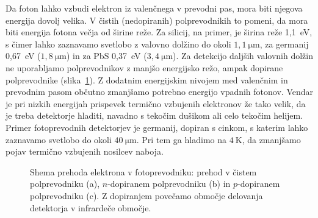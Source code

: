 Da foton lahko vzbudi elektron iz valenčnega v prevodni pas, mora biti njegova energija dovolj velika. 
V čistih (nedopiranih) polprevodnikih to pomeni, da mora biti energija fotona večja od 
širine reže. Za silicij, na primer, je širina reže 1,1~eV, 
s čimer lahko zaznavamo svetlobo z valovno dolžino do okoli 
$1,1~\si{\micro\meter}$, za germanij 0,67~eV ($1,8~\si{\micro\meter}$) in za PbS 0,37~eV
($3,4~\si{\micro\meter}$). 
Za detekcijo daljših valovnih dolžin ne uporabljamo polprevodnikov
z manjšo energijsko režo, ampak dopirane polprevodnike (slika~\ref{fig:FPrevodnik}). 
Z dodatnim energijskim nivojem med valenčnim in prevodnim pasom občutno zmanjšamo 
potrebno energijo vpadnih fotonov. Vendar je pri  nizkih energijah prispevek termično 
vzbujenih elektronov že tako velik, da je treba detektorje hladiti, navadno s tekočim
dušikom ali celo tekočim helijem. Primer fotoprevodnih detektorjev je germanij, dopiran s cinkom, 
s katerim lahko zaznavamo svetlobo do okoli $40~\si{\micro\meter}$. Pri tem ga hladimo
na $4~\si{\kelvin}$, da zmanjšamo pojav termično vzbujenih nosilcev naboja. 
\begin{figure}[h]
\centering
\def\svgwidth{150truemm} 

\caption{Shema prehoda elektrona v fotoprevodniku: prehod v čistem polprevodniku (a), 
$n$-dopiranem polprevodniku (b) in $p$-dopiranem polprevodniku (c). 
Z dopiranjem povečamo območje delovanja detektorja v infrardeče območje. }
\label{fig:FPrevodnik}
\end{figure}

